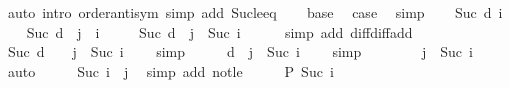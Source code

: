 \begin{isabellebody}
\ {\isacharparenleft}{\kern0pt}auto\ intro{\isacharcolon}{\kern0pt}\ order{\isacharunderscore}{\kern0pt}antisym\ simp\ add{\isacharcolon}{\kern0pt}\ Suc{\isacharunderscore}{\kern0pt}le{\isacharunderscore}{\kern0pt}eq{\isacharparenright}{\kern0pt}\isanewline
\ \ \isamarkupfalse%
\ base\ \isamarkupfalse%
\ {\isacharquery}{\kern0pt}case\ \isamarkupfalse%
\ simp\isanewline
{}\isamarkupfalse%
\isanewline
\ \ \isamarkupfalse%
\ {\isacharparenleft}{\kern0pt}Suc\ d\ i{\isacharparenright}{\kern0pt}\isanewline
\ \ \isamarkupfalse%
\ {\isacartoucheopen}Suc\ d\ {\isacharequal}{\kern0pt}\ j\ {\isacharminus}{\kern0pt}\ i\ {\isacharminus}{\kern0pt}\ {}{\isacartoucheclose}\ \isamarkupfalse%
\ {\isacharasterisk}{\kern0pt}{\isacharcolon}{\kern0pt}\ {\isachardoublequoteopen}Suc\ d\ {\isacharequal}{\kern0pt}\ j\ {\isacharminus}{\kern0pt}\ Suc\ i{\isachardoublequoteclose}\isanewline
\ \ \ \ \isamarkupfalse%
\ {\isacharparenleft}{\kern0pt}simp\ add{\isacharcolon}{\kern0pt}\ diff{\isacharunderscore}{\kern0pt}diff{\isacharunderscore}{\kern0pt}add{\isacharparenright}{\kern0pt}\isanewline
\ \ \isamarkupfalse%
\ \isamarkupfalse%
\ {\isachardoublequoteopen}Suc\ d\ {\isacharminus}{\kern0pt}\ {}\ {\isacharequal}{\kern0pt}\ j\ {\isacharminus}{\kern0pt}\ Suc\ i\ {\isacharminus}{\kern0pt}\ {}{\isachardoublequoteclose}\ \isamarkupfalse%
\ simp\isanewline
\ \ \isamarkupfalse%
\ \isamarkupfalse%
\ {\isachardoublequoteopen}d\ {\isacharequal}{\kern0pt}\ j\ {\isacharminus}{\kern0pt}\ Suc\ i\ {\isacharminus}{\kern0pt}\ {}{\isachardoublequoteclose}\ \isamarkupfalse%
\ simp\isanewline
\ \ \isamarkupfalse%
\ \isamarkupfalse%
\ {\isacharasterisk}{\kern0pt}\ \isamarkupfalse%
\ {\isachardoublequoteopen}j\ {\isacharminus}{\kern0pt}\ Suc\ i\ {\isasymnoteq}\ {}{\isachardoublequoteclose}\ \isamarkupfalse%
\ auto\isanewline
\ \ \isamarkupfalse%
\ \isamarkupfalse%
\ {\isachardoublequoteopen}Suc\ i\ {\isacharless}{\kern0pt}\ j{\isachardoublequoteclose}\ \isamarkupfalse%
\ {\isacharparenleft}{\kern0pt}simp\ add{\isacharcolon}{\kern0pt}\ not{\isacharunderscore}{\kern0pt}le{\isacharparenright}{\kern0pt}\isanewline
\ \ \isamarkupfalse%
\ \isamarkupfalse%
\ {\isachardoublequoteopen}P\ {\isacharparenleft}{\kern0pt}Suc\ i{\isacharparenright}{\kern0pt}{\isachardoublequoteclose}\ \isamarkupfalse%

\end{isabellebody}
